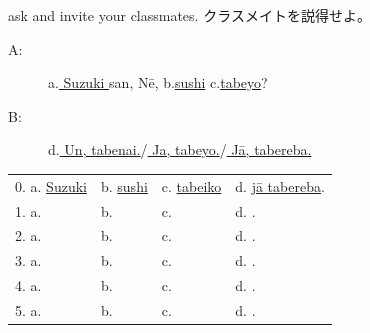 \documentclass[uplatex,dvipdfmx,b5paper,english,10pt]{jsbook}
\begin{document}
\begin{toiquestion}
\ifEnglish
ask and invite your classmates.
\else
クラスメイトを説得せよ。
\fi
\end{toiquestion}

\begin{description}
 \item[A:] a.\underline{ Suzuki } san,  N\=e, b.\underline{sushi} c.\underline{tabeyo}?
 \item[B:] d.\underline{ Un, tabenai.}/\underline{ Ja, tabeyo.}/\underline{ J\=a, tabereba.}
\end{description}

\begin{tabular}[t]{llll}
 0. a. \underline{ Suzuki\hspace{2.5zw}}
 &  b. \underline{ sushi\hspace{3.3zw}}
 &  c. \underline{ tabeiko\hspace{2.0zw}}
 &  d. \underline{ j\=a tabereba\hspace{0.5zw}}.\\
 1. a. \underline{\hspace{6zw}}& b. \underline{\hspace{6zw}} & c. \underline{\hspace{6zw}} & d. \underline{\hspace{6zw}}.\\
 2. a. \underline{\hspace{6zw}}& b. \underline{\hspace{6zw}} & c. \underline{\hspace{6zw}} & d. \underline{\hspace{6zw}}.\\
 3. a. \underline{\hspace{6zw}}& b. \underline{\hspace{6zw}} & c. \underline{\hspace{6zw}} & d. \underline{\hspace{6zw}}.\\
 4. a. \underline{\hspace{6zw}}& b. \underline{\hspace{6zw}} & c. \underline{\hspace{6zw}} & d. \underline{\hspace{6zw}}.\\
 5. a. \underline{\hspace{6zw}}& b. \underline{\hspace{6zw}} & c. \underline{\hspace{6zw}} & d. \underline{\hspace{6zw}}.\\

\end{tabular}
\end{document}
